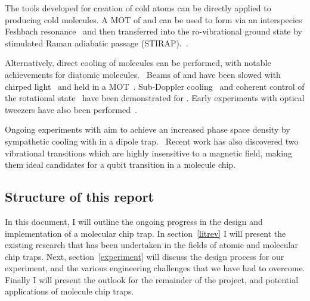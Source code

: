 The tools developed for creation of cold atoms can be
directly applied to producing cold molecules. A MOT of \esRb and
\ootCs can be used to form \RbCs via an interspecies Feshbach
resonance~\cite{PhysRevA.85.032506, PhysRevA.89.033604} and then transferred into
the ro-vibrational ground state by stimulated Raman adiabatic passage
(STIRAP).~\cite{PhysRevLett.113.255301, RevModPhys.70.1003}.

Alternatively, direct cooling of molecules can be performed, with notable
achievements for diatomic molecules.~\cite{Shuman2010} Beams of \SrF and
\CaF have been slowed with chirped light~\cite{PhysRevLett.108.103002,
Truppe2017a} and held in a MOT~\cite{Barry2014, Williams2017}. Sub-Doppler
cooling~\cite{Truppe2017} and coherent control of the rotational
state~\cite{PhysRevLett.120.163201,Blackmore_2018} have been demonstrated for
\CaF. Early experiments with optical tweezers have also been
performed~\cite{Anderegg2019}.


Ongoing experiments with \CaF aim to achieve an increased phase space density by
sympathetic cooling with \esRb in a dipole trap.~ Recent
work has also discovered two vibrational transitions which are highly
insensitive to a magnetic field, making them ideal candidates for a qubit
transition in a molecule chip.~

\subsection{Structure of this report}

In this document, I will outline the ongoing progress in the design and
implementation of a molecular chip trap. In section~\ref{litrev} I will present
the existing research that has been undertaken in the fields of atomic and
molecular chip traps. Next, section~\ref{experiment} will discuss the design
process for our experiment, and the various engineering challenges that we have
had to overcome. Finally I will present the outlook for the remainder of the
project, and potential applications of molecule chip traps.
